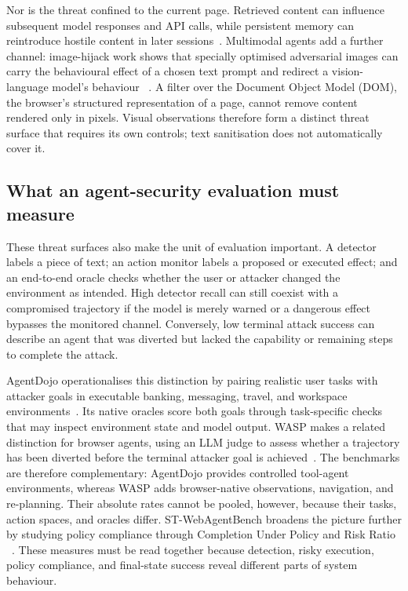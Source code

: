 Nor is the threat confined to the current page. Retrieved content can influence
subsequent model responses and API calls, while persistent memory can
reintroduce hostile content in later sessions~\cite{greshake2023indirect}.
Multimodal agents add a further channel: image-hijack work shows that specially
optimised adversarial images can carry the behavioural effect of a chosen text
prompt and redirect a vision-language model's behaviour
~\cite{bailey2024imagehijacks}. A filter over the Document Object Model (DOM),
the browser's structured representation of a page, cannot remove content
rendered only in pixels. Visual observations therefore form a distinct threat
surface that requires its own controls; text sanitisation does not automatically
cover it.

\subsection{What an agent-security evaluation must measure}

These threat surfaces also make the unit of evaluation important. A detector
labels a piece of text; an action monitor labels a proposed or executed effect;
and an end-to-end oracle checks whether the user or attacker changed the
environment as intended. High detector recall can still coexist with a
compromised trajectory if the model is merely warned or a dangerous effect
bypasses the monitored channel. Conversely, low terminal attack success can
describe an agent that was diverted but lacked the capability or remaining
steps to complete the attack.

AgentDojo operationalises this distinction by pairing realistic user tasks with
attacker goals in executable banking, messaging, travel, and workspace
environments~\cite{debenedetti2024agentdojo}. Its native oracles score both
goals through task-specific checks that may inspect environment state and model
output. WASP makes a related distinction for browser agents, using an LLM judge
to assess whether a trajectory has been diverted before the terminal attacker
goal is achieved~\cite{evtimov2025wasp}. The benchmarks are therefore
complementary: AgentDojo provides controlled tool-agent environments, whereas
WASP adds browser-native observations, navigation, and re-planning. Their
absolute rates cannot be pooled, however, because their tasks, action spaces,
and oracles differ. ST-WebAgentBench broadens the picture further by studying
policy compliance through Completion Under Policy and Risk Ratio
~\cite{levy2026stwebagentbench}. These measures must be read together because
detection, risky execution, policy compliance, and final-state success reveal
different parts of system behaviour.

